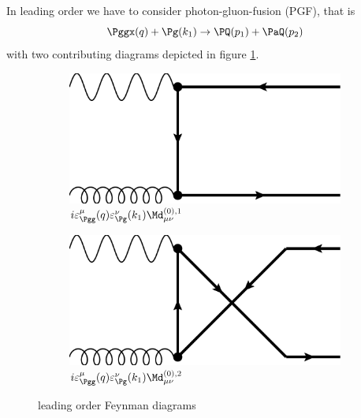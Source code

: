 In leading order we have to consider photon-gluon-fusion (PGF), that is
\begin{equation}
\Pggx(q) + \Pg(k_1) \rightarrow \PQ(p_1)+\PaQ(p_2)
\end{equation}
with two contributing diagrams depicted in figure \ref{fig:FeynLO}.
\begin{figure}[ht!]
\centering
\begin{subfigure}[t]{.4\textwidth}
	\includegraphics[width=\textwidth]{pyfeyn/lo-1}
	\caption{$i\varepsilon^{\mu}_{\Pgg}(q)\varepsilon^{\nu}_{\Pg}(k_1)\Md^{(0),1}_{\mu\nu}$}
\end{subfigure}\hspace{.15\textwidth}%
\begin{subfigure}[t]{.4\textwidth}
	\includegraphics[width=\textwidth]{pyfeyn/lo-2}
	\caption{$i\varepsilon^{\mu}_{\Pgg}(q)\varepsilon^{\nu}_{\Pg}(k_1)\Md^{(0),2}_{\mu\nu}$}
\end{subfigure}
\caption{leading order Feynman diagrams}\label{fig:FeynLO}
\end{figure}

